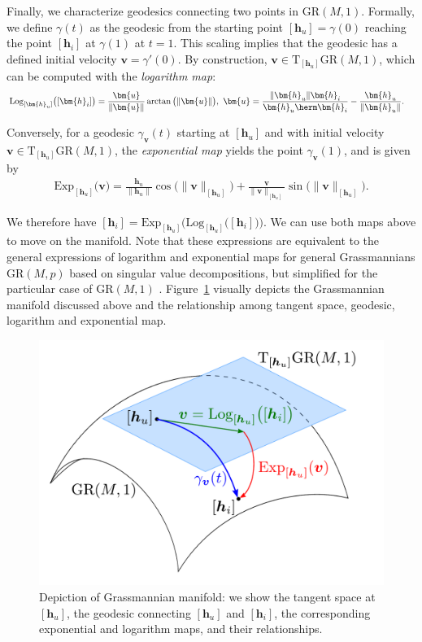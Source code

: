 Finally, we characterize geodesics connecting two points in $\mathrm{GR}(M,1)$. Formally, we define $\gamma(t)$ as the geodesic from the starting point $[\bm{h}_u]=\gamma(0)$ reaching the point $[\bm{h}_i]$ at $\gamma(1)$ at $t=1$. This scaling implies that the geodesic has a defined initial velocity $\bm{v}=\gamma'(0)$. By construction, $\bm{v}\in\mathrm{T}_{[\bm{h}_u]}\mathrm{GR}(M,1)$, which can be computed with the \emph{logarithm map}:
\begin{align}
	\mathrm{Log}_{[\bm{h}_u]}\big([\bm{h}_i]\big)&=\frac{\bm{u}}{\|\bm{u}\|
	}\arctan\big(\|\bm{u}\|
	\big),\,\,\bm{u}=\frac{\|\bm{h}_u\|\bm{h}_i}{\bm{h}_u\herm\bm{h}_i}-\frac{\bm{h}_u}{\|\bm{h}_u\|}.\nonumber
\end{align}


Conversely, for a geodesic $\gamma_{\bm{v}}(t)$ starting at $[\bm{h}_u]$ and with initial velocity $\bm{v}\in\mathrm{T}_{[\bm{h}_u]}\mathrm{GR}(M,1)$, the \emph{exponential map} yields the point $\gamma_{\bm{v}}(1)$, and is given by
\begin{align}
	\mathrm{Exp}_{[\bm{h}_u]}\big(\bm{v}\big)= \frac{\bm{h}_u}{\|\bm{h}_u\|}\cos\big(\|\bm{v}\|_{[\bm{h}_u]}\big)+\frac{\bm{v}}{\|\bm{v}\|_{[\bm{h}_u]}}\sin\big(\|\bm{v}\|_{[\bm{h}_u]}\big).\nonumber
\end{align}

We therefore have $[\bm{h}_i]=\mathrm{Exp}_{[\bm{h}_u]}\big(\mathrm{Log}_{[\bm{h}_u]}\big([\bm{h}_i]\big)\big)$. We can use both maps above to move on the manifold.
Note that these expressions are equivalent to the general expressions of logarithm and exponential maps for general Grassmannians $\mathrm{GR}(M,p)$ based on singular value decompositions, but simplified for the particular case of $\mathrm{GR}(M,1)$ \cite{Absil2008book}. Figure~\ref{usch:fig:manifold_geodesics} 
visually depicts the Grassmannian manifold discussed above and the relationship among tangent space, geodesic, logarithm and exponential map. 
\begin{figure}[tbp]
	\centering
	\includegraphics[width=.6\linewidth]{./figs/usch_figs/q_manifold_geodesics_h.pdf}
	\caption[Depiction of Grassmannian manifold.]{Depiction of Grassmannian manifold: we show the tangent space at $[\bm{h}_u]$, the geodesic connecting $[\bm{h}_u]$ and $[\bm{h}_i]$, the corresponding exponential and logarithm maps, and their relationships.}
	\label{usch:fig:manifold_geodesics}
\end{figure}

